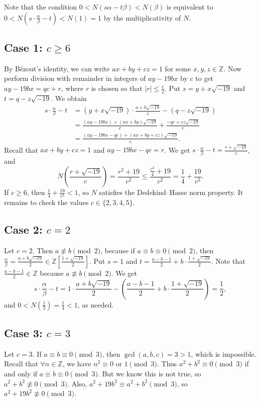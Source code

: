 \documentclass[a4paper,12pt]{report}
\begin{document}
Note that the condition $0<N(s\alpha-t\beta)<N(\beta)$ is equivalent to $0<N\left(s\cdot\frac{\alpha}{\beta}-t\right)<N(1)=1$ by the multiplicativity of $N$. 

\subsection*{Case 1: $c\geq 6$}

By Bézout's identity, we can write $ax+by+cz=1$ for some $x,y,z\in\mathbb{Z}$. Now perform division with remainder in integers of $ay-19bx$ by $c$ to get $ay-19bx=qc+r$, where $r$ is chosen so that $|r|\le\frac{c}{2}$. Put $s=y+x\sqrt{-19}$ and $t=q-z\sqrt{-19}$. We obtain
\begin{align*}
    s\cdot\frac{\alpha}{\beta}-t
    &=(y+x\sqrt{-19})\cdot \frac{a+b\sqrt{-19}}{c}-(q-z\sqrt{-19}) \\
    &=\frac{(ay-19bx)+(ax+by)\sqrt{-19}}{c}+\frac{-qc+cz\sqrt{-19}}{c}\\ 
    &=\frac{(ay-19bx-qc)+(ax+by+cz)\sqrt{-19}}{c}.
\end{align*}
Recall that $ax+by+cz=1$ and $ay-19bx-qc=r$. We get $s\cdot\frac{\alpha}{\beta}-t=\frac{r+\sqrt{-19}}{c}$, and
\[
    N\left(\frac{r+\sqrt{-19}}{c}\right)=\frac{r^2+19}{c^2}\le\frac{\frac{c^2}{4}+19}{c^2}=\frac{1}{4}+\frac{19}{c^2}.
\]
If $c\ge 6$, then $\frac{1}{4}+\frac{19}{c^2}<1$, so $N$ satisfies the Dedekind--Hasse norm property. It remains to check the values $c\in\{2,3,4,5\}$.

\subsection*{Case 2: $c=2$}

Let $c=2$. Then $a\not \equiv b\pmod{2}$, because if $a\equiv b\equiv 0\pmod{2}$, then $\frac{\alpha}{\beta}=\frac{a+b\sqrt{-19}}{2} \in\mathbb{Z}\left[\frac{1+\sqrt{-19}}{2}\right]$. Put $s=1$ and $t=\frac{a-b-1}{2}+b\cdot \frac{1+\sqrt{-19}}{2}$. Note that $\frac{a-b-1}{2}\in\mathbb{Z}$ because $a\not \equiv b\pmod{2}$. We get
\[
    s\cdot\frac{\alpha}{\beta}-t=1\cdot\frac{a+b\sqrt{-19}}{2}-\left(\frac{a-b-1}{2}+b\cdot \frac{1+\sqrt{-19}}{2}\right)=\frac{1}{2},
\]
and $0<N\left(\frac{1}{2}\right)=\frac{1}{4}<1$, as needed.

\subsection*{Case 3: $c=3$}

Let $c=3$. If $a\equiv b\equiv 0\pmod{3}$, then $\gcd(a,b,c)=3>1$, which is impossible. Recall that $\forall n\in\mathbb{Z}$, we have $n^2\equiv 0$ or $1\pmod{3}$. Thus $a^2+b^2\equiv 0\pmod{3}$ if and only if $a\equiv b\equiv 0\pmod{3}$. But we know this is not true, so $a^2+b^2\not\equiv 0\pmod{3}$. Also, $a^2+19b^2\equiv a^2+b^2\pmod{3}$, so $a^2+19b^2\not\equiv 0\pmod{3}$. 
\end{document}
